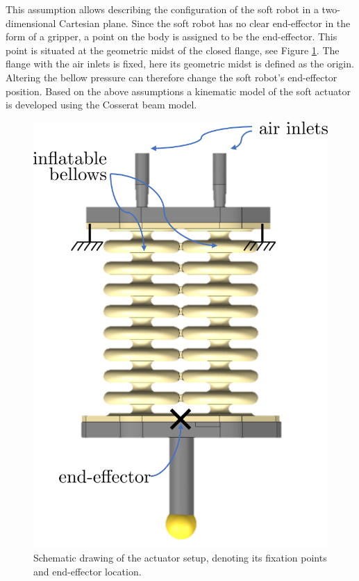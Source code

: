 This assumption allows describing the configuration of the soft robot in a two-dimensional Cartesian plane. Since the soft robot has no clear end-effector in the form of a gripper, a point on the body is assigned to be the end-effector. This point is situated at the geometric midst of the closed flange, see Figure \ref{fig2:setup}. The flange with the air inlets is fixed, here its geometric midst is defined as the origin. Altering the bellow pressure can therefore change the soft robot's end-effector position. Based on the above assumptions a kinematic model of the soft actuator is developed using the Cosserat beam model. 



\begin{figure}[H]
\begin{minipage}{.5\textwidth}
  \centering
  \includegraphics[width =0.8\linewidth]{Figures/Chapter2/setup.png}
  \caption{Schematic drawing of the actuator setup, denoting its fixation points and end-effector location.}
  \label{fig2:setup}
\end{minipage}
\begin{minipage}{.5\textwidth}
  \centering

\end{minipage}
\end{figure}
